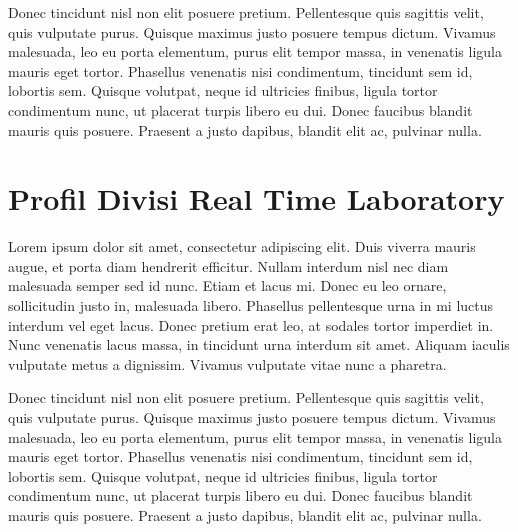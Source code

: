 Donec tincidunt nisl non elit posuere pretium. Pellentesque quis sagittis velit, quis vulputate purus. Quisque maximus justo posuere tempus dictum. Vivamus malesuada, leo eu porta elementum, purus elit tempor massa, in venenatis ligula mauris eget tortor. Phasellus venenatis nisi condimentum, tincidunt sem id, lobortis sem. Quisque volutpat, neque id ultricies finibus, ligula tortor condimentum nunc, ut placerat turpis libero eu dui. Donec faucibus blandit mauris quis posuere. Praesent a justo dapibus, blandit elit ac, pulvinar nulla. 

\section{Profil Divisi Real Time Laboratory}
Lorem ipsum dolor sit amet, consectetur adipiscing elit. Duis viverra mauris augue, et porta diam hendrerit efficitur. Nullam interdum nisl nec diam malesuada semper sed id nunc. Etiam et lacus mi. Donec eu leo ornare, sollicitudin justo in, malesuada libero. Phasellus pellentesque urna in mi luctus interdum vel eget lacus. Donec pretium erat leo, at sodales tortor imperdiet in. Nunc venenatis lacus massa, in tincidunt urna interdum sit amet. Aliquam iaculis vulputate metus a dignissim. Vivamus vulputate vitae nunc a pharetra.

Donec tincidunt nisl non elit posuere pretium. Pellentesque quis sagittis velit, quis vulputate purus. Quisque maximus justo posuere tempus dictum. Vivamus malesuada, leo eu porta elementum, purus elit tempor massa, in venenatis ligula mauris eget tortor. Phasellus venenatis nisi condimentum, tincidunt sem id, lobortis sem. Quisque volutpat, neque id ultricies finibus, ligula tortor condimentum nunc, ut placerat turpis libero eu dui. Donec faucibus blandit mauris quis posuere. Praesent a justo dapibus, blandit elit ac, pulvinar nulla. 

